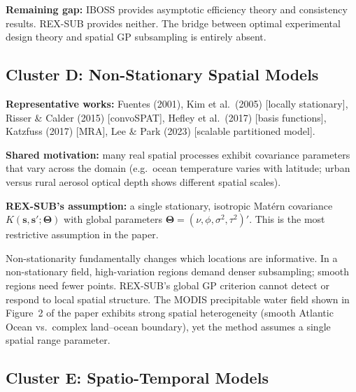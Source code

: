 \documentclass[12pt, a4paper]{article}
\begin{document}
\begin{warnbox}
  \textbf{Remaining gap:} IBOSS provides asymptotic efficiency theory and
  consistency results.  REX-SUB provides neither.  The bridge between optimal
  experimental design theory and spatial GP subsampling is entirely absent.
\end{warnbox}

\subsection{Cluster D: Non-Stationary Spatial Models}

\textbf{Representative works:} Fuentes (2001), Kim et al.\ (2005) [locally
stationary], Risser \& Calder (2015) [convoSPAT], Hefley et al.\ (2017) [basis
functions], Katzfuss (2017) [MRA], Lee \& Park (2023) [scalable partitioned model].

\textbf{Shared motivation:} many real spatial processes exhibit covariance parameters
that vary across the domain (e.g.\ ocean temperature varies with latitude; urban
versus rural aerosol optical depth shows different spatial scales).

\textbf{REX-SUB's assumption:} a single stationary, isotropic Matérn covariance
$K(\mathbf{s}, \mathbf{s}'; \boldsymbol{\Theta})$ with global parameters
$\boldsymbol{\Theta} = (\nu, \phi, \sigma^2, \tau^2)'$.  This is the most
restrictive assumption in the paper.

\begin{critbox}[title=\textbf{Critical Gap (Most Restrictive Assumption)}]
  Non-stationarity fundamentally changes which locations are informative.  In a
  non-stationary field, high-variation regions demand denser subsampling; smooth
  regions need fewer points.  REX-SUB's global GP criterion cannot detect or respond
  to local spatial structure.  The MODIS precipitable water field shown in Figure~2
  of the paper exhibits strong spatial heterogeneity (smooth Atlantic Ocean vs.\
  complex land--ocean boundary), yet the method assumes a single spatial range
  parameter.
\end{critbox}

\subsection{Cluster E: Spatio-Temporal Models}
\end{document}
